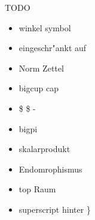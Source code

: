 \documentclass[class=article, crop=false]{standalone}
\begin{document}
\begin{zettel}{TODO}
    \begin{itemize}
        \item winkel symbol
        \item eingeschr"ankt auf
        \item Norm Zettel
        \item bigcup cap
        \item \$ \$ -
        \item bigpi
        \item skalarprodukt
        \item Endomrophismus 
        \item top Raum
        \item superscript hinter \}
    \end{itemize}
\end{zettel}
\end{document}
